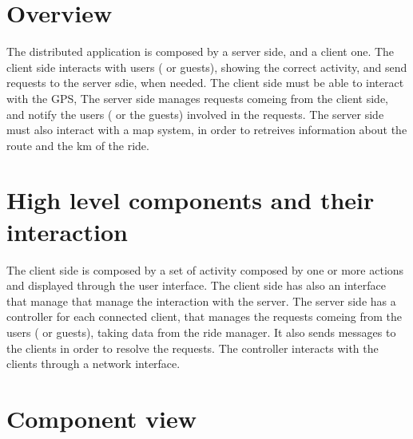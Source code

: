 \section{Overview}
The distributed application is composed by a server side, and a client one.
The client side interacts with users ( or guests), showing the correct activity, and send requests to the server sdie, when needed.
The client side must be able to interact with the GPS,
The server side manages requests comeing from the client side, and notify the users ( or the guests) involved in the requests.
The server side must also interact with a map system, in order to retreives information about the route and the km of the ride.
\section{High level components and their interaction}
The client side is composed by a set of activity composed by one or more actions and displayed through the user interface.
The client side has also an interface that manage that manage the interaction with the server.
The server side has a controller for each connected client, that manages the requests comeing from the users ( or guests), 
taking data from the ride manager. It also sends messages to the clients in order to resolve the requests.
The controller interacts with the clients through a network interface.
\section{Component view}

